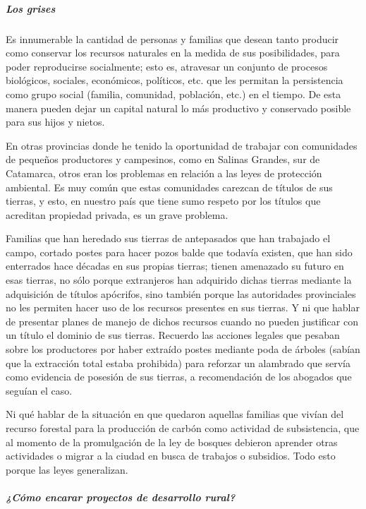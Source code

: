 \documentclass[
]{article}
\begin{document}
\hypertarget{los-grises}{%
\subparagraph{Los grises}\label{los-grises}}

Es innumerable la cantidad de personas y familias que desean tanto
producir como conservar los recursos naturales en la medida de sus
posibilidades, para poder reproducirse socialmente; esto es, atravesar
un conjunto de procesos biológicos, sociales, económicos, políticos,
etc. que les permitan la persistencia como grupo social (familia,
comunidad, población, etc.) en el tiempo. De esta manera pueden dejar un
capital natural lo más productivo y conservado posible para sus hijos y
nietos.

En otras provincias donde he tenido la oportunidad de trabajar con
comunidades de pequeños productores y campesinos, como en Salinas
Grandes, sur de Catamarca, otros eran los problemas en relación a las
leyes de protección ambiental. Es muy común que estas comunidades
carezcan de títulos de sus tierras, y esto, en nuestro país que tiene
sumo respeto por los títulos que acreditan propiedad privada, es un
grave problema.

Familias que han heredado sus tierras de antepasados que han trabajado
el campo, cortado postes para hacer pozos balde que todavía existen, que
han sido enterrados hace décadas en sus propias tierras; tienen
amenazado su futuro en esas tierras, no sólo porque extranjeros han
adquirido dichas tierras mediante la adquisición de títulos apócrifos,
sino también porque las autoridades provinciales no les permiten hacer
uso de los recursos presentes en sus tierras. Y ni que hablar de
presentar planes de manejo de dichos recursos cuando no pueden
justificar con un título el dominio de sus tierras. Recuerdo las
acciones legales que pesaban sobre los productores por haber extraído
postes mediante poda de árboles (sabían que la extracción total estaba
prohibida) para reforzar un alambrado que servía como evidencia de
posesión de sus tierras, a recomendación de los abogados que seguían el
caso.

Ni qué hablar de la situación en que quedaron aquellas familias que
vivían del recurso forestal para la producción de carbón como actividad
de subsistencia, que al momento de la promulgación de la ley de bosques
debieron aprender otras actividades o migrar a la ciudad en busca de
trabajos o subsidios. Todo esto porque las leyes generalizan.

\hypertarget{cuxf3mo-encarar-proyectos-de-desarrollo-rural}{%
\subparagraph{¿Cómo encarar proyectos de desarrollo
rural?}\label{cuxf3mo-encarar-proyectos-de-desarrollo-rural}}
\end{document}
